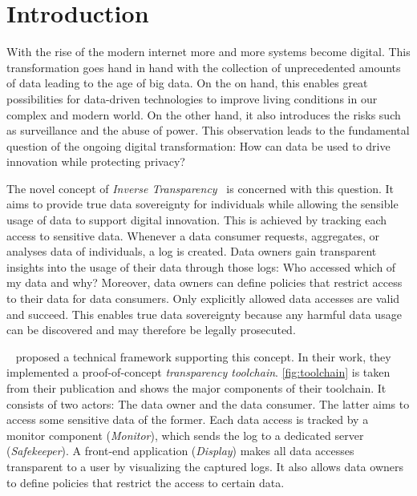 \documentclass[../main.tex]{subfiles}
\begin{document}
\chapter{Introduction}
With the rise of the modern internet more and more systems become digital.
This transformation goes hand in hand with the collection of unprecedented amounts of data leading to the age of big data.
On the on hand, this enables great possibilities for data-driven technologies to improve living conditions in our complex and modern world.
On the other hand, it also introduces the risks such as surveillance and the abuse of power.
This observation leads to the fundamental question of the ongoing digital transformation: How can data be used to drive innovation while protecting privacy?~\cite{Boes2022, Schallmo2016}

The novel concept of \emph{Inverse Transparency}~\cite{Boes2022} is concerned with this question.
It aims to provide true data sovereignty for individuals while allowing the sensible usage of data to support digital innovation.
This is achieved by tracking each access to sensitive data.
Whenever a data consumer requests, aggregates, or analyses data of individuals, a log is created.
Data owners gain transparent insights into the usage of their data through those logs:
Who accessed which of my data and why?
Moreover, data owners can define policies that restrict access to their data for data consumers.
Only explicitly allowed data accesses are valid and succeed.
This enables true data sovereignty because any harmful data usage can be discovered and may therefore be legally prosecuted.

\citeauthor{Zieglmeier2021}~\cite{Zieglmeier2021} proposed a technical framework supporting this concept.
In their work, they implemented a proof-of-concept \emph{transparency toolchain}.
\cref{fig:toolchain} is taken from their publication and shows the major components of their toolchain.
It consists of two actors: The data owner and the data consumer.
The latter aims to access some sensitive data of the former.
Each data access is tracked by a monitor component (\emph{Monitor}), which sends the log to a dedicated server (\emph{Safekeeper}).
A front-end application (\emph{Display}) makes all data accesses transparent to a user by visualizing the captured logs.
It also allows data owners to define policies that restrict the access to certain data.
\end{document}
